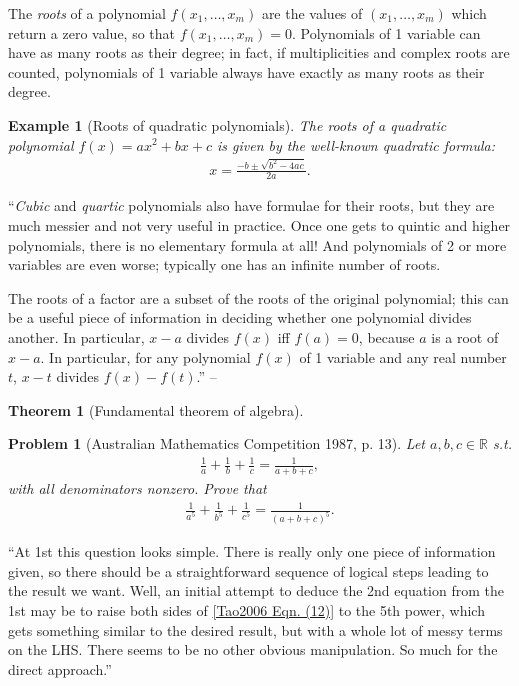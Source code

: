 \documentclass[oneside]{book}
\numberwithin{equation}{section}
\newtheorem{theorem}{Theorem}[section]
\newtheorem{example}{Example}[section]
\newtheorem{problem}{Problem}[section]
\begin{document}
The \emph{roots} of a polynomial $f(x_1,\ldots,x_m)$ are the values of $(x_1,\ldots,x_m)$ which return a zero value, so that $f(x_1,\ldots,x_m) = 0$. Polynomials of 1 variable can have as many roots as their degree; in fact, if multiplicities and complex roots are counted, polynomials of 1 variable always have exactly as many roots as their degree.

\begin{example}[Roots of quadratic polynomials]
	The roots of a quadratic polynomial $f(x) = ax^2 + bx + c$ is given by the well-known \emph{quadratic formula}:
	\begin{align*}
		x = \frac{-b\pm\sqrt{b^2 - 4ac}}{2a}.
	\end{align*}
\end{example}
``\textit{Cubic} and \textit{quartic} polynomials also have formulae for their roots, but they are much messier and not very useful in practice. Once one gets to quintic and higher polynomials, there is no elementary formula at all! And polynomials of 2 or more variables are even worse; typically one has an infinite number of roots.

The roots of a factor are a subset of the roots of the original polynomial; this can be a useful piece of information in deciding whether one polynomial divides another. In particular, $x - a$ divides $f(x)$ iff $f(a) = 0$, because $a$ is a root of $x - a$. In particular, for any polynomial $f(x)$ of 1 variable and any real number $t$, $x - t$ divides $f(x) - f(t)$.'' -- \cite[p. 42]{Tao2006}

\begin{theorem}[Fundamental theorem of algebra]
	
\end{theorem}

\begin{problem}[Australian Mathematics Competition 1987, p. 13]
	Let $a,b,c\in\mathbb{R}$ s.t.
	\begin{align}
		\label{Tao2006 Eqn. (12)}
		\frac{1}{a} + \frac{1}{b} + \frac{1}{c} = \frac{1}{a + b + c},
	\end{align}
	with all denominators nonzero. Prove that
	\begin{align*}
		\frac{1}{a^5} + \frac{1}{b^5} + \frac{1}{c^5} = \frac{1}{(a + b + c)^5}.
	\end{align*}
\end{problem}
``At 1st this question looks simple. There is really only one piece of information given, so there should be a straightforward sequence of logical steps leading to the result we want. Well, an initial attempt to deduce the 2nd equation from the 1st may be to raise both sides of \eqref{Tao2006 Eqn. (12)} to the 5th power, which gets something similar to the desired result, but with a whole lot of messy terms on the LHS. There seems to be no other obvious manipulation. So much for the direct approach.''
\end{document}
